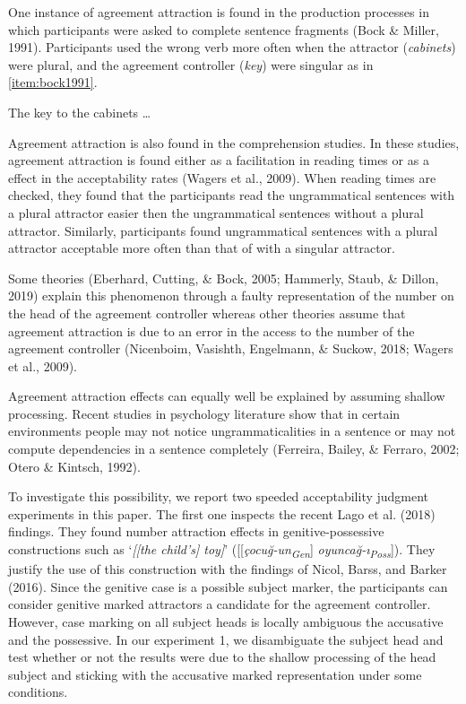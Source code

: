 \documentclass[
  english,
  doc,floatsintext]{apa6}
\begin{document}
One instance of agreement attraction is found in the production processes in which participants were asked to complete sentence fragments (Bock \& Miller, 1991). Participants used the wrong verb more often when the attractor (\emph{cabinets}) were plural, and the agreement controller (\emph{key}) were singular as in \ref{item:bock1991}.

\begin{exe}
\ex The key to the cabinets \ldots 
\label{item:bock1991}
\end{exe}

Agreement attraction is also found in the comprehension studies. In these studies, agreement attraction is found either as a facilitation in reading times or as a effect in the acceptability rates (Wagers et al., 2009).
When reading times are checked, they found that the participants read the ungrammatical sentences with a plural attractor easier then the ungrammatical sentences without a plural attractor.
Similarly, participants found ungrammatical sentences with a plural attractor acceptable more often than that of with a singular attractor.

Some theories (Eberhard, Cutting, \& Bock, 2005; Hammerly, Staub, \& Dillon, 2019) explain this phenomenon through a faulty representation of the number on the head of the agreement controller whereas other theories assume that agreement attraction is due to an error in the access to the number of the agreement controller (Nicenboim, Vasishth, Engelmann, \& Suckow, 2018; Wagers et al., 2009).

Agreement attraction effects can equally well be explained by assuming shallow processing. Recent studies in psychology literature show that in certain environments people may not notice ungrammaticalities in a sentence or may not compute dependencies in a sentence completely (Ferreira, Bailey, \& Ferraro, 2002; Otero \& Kintsch, 1992).

To investigate this possibility, we report two speeded acceptability judgment experiments in this paper. The first one inspects the recent Lago et al. (2018) findings. They found number attraction effects in genitive-possessive constructions such as `\emph{{[}{[}the child's{]} toy{]}}' ({[}{[}\emph{çocuğ-un\textsubscript{Gen}}{]} \emph{oyuncağ-ı\textsubscript{Poss}}{]}). They justify the use of this construction with the findings of Nicol, Barss, and Barker (2016). Since the genitive case is a possible subject marker, the participants can consider genitive marked attractors a candidate for the agreement controller. However, case marking on all subject heads is locally ambiguous the accusative and the possessive. In our experiment 1, we disambiguate the subject head and test whether or not the results were due to the shallow processing of the head subject and sticking with the accusative marked representation under some conditions.
\end{document}

